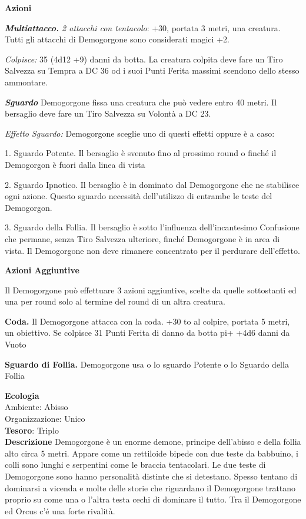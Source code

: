 \begin{multicols}{2}
\textbf{Azioni}

\textit{\textbf{Multiattacco.} 2 attacchi con tentacolo}: +30, portata 3 metri, una creatura. Tutti gli attacchi di Demogorgone sono considerati magici +2.

\textit{Colpisce:} 35 (4d12 +9) danni da botta. La creatura colpita deve fare un Tiro Salvezza su Tempra a DC 36 od i suoi Punti Ferita massimi scendono dello stesso ammontare.

\textit{\textbf{Sguardo}} Demogorgone fissa una creatura che può vedere entro 40 metri. Il bersaglio deve fare un Tiro Salvezza su Volontà a DC 23.

\textit{Effetto Sguardo:} Demogorgone sceglie uno di questi effetti oppure è a caso:

1. Sguardo Potente. Il bersaglio è svenuto fino al prossimo round o finché il Demogorgon è fuori dalla linea di vista

2. Sguardo Ipnotico. Il bersaglio è in dominato dal Demogorgone che ne stabilisce ogni azione. Questo sguardo necessità dell'utilizzo di entrambe le teste del Demogorgon.

3. Sguardo della Follia. Il bersaglio è sotto l'influenza dell'incantesimo Confusione che permane, senza Tiro Salvezza ulteriore, finché Demogorgone è in area di vista. Il Demogorgone non deve rimanere concentrato per il perdurare dell'effetto.

\textbf{Azioni Aggiuntive}

Il Demogorgone può effettuare 3 azioni aggiuntive, scelte da quelle sottostanti ed una per round solo al termine del round di un altra creatura.

\textbf{Coda.} Il Demogorgone attacca con la coda. +30 to al colpire, portata 5 metri, un obiettivo. Se colpisce 31 Punti Ferita di danno da botta pi+ +4d6 danni da Vuoto

\textbf{Sguardo di Follia.} Demogorgone usa o lo sguardo Potente o lo Sguardo della Follia

\textbf{Ecologia}\\
Ambiente: Abisso\\
Organizzazione: Unico\\
\textbf{Tesoro}: Triplo\\

\textbf{Descrizione}
Demogorgone è un enorme demone, principe dell'abisso e della follia alto circa 5 metri. Appare come un rettiloide bipede con due teste da babbuino, i colli sono lunghi e serpentini come le braccia tentacolari. Le due teste di Demogorgone sono hanno personalità distinte che si detestano. Spesso tentano di dominarsi a vicenda e molte delle storie che riguardano il Demogorgone trattano proprio su come una o l'altra testa cechi di dominare il tutto. Tra il Demogorgone ed Orcus c'é una forte rivalità.



\end{multicols}
